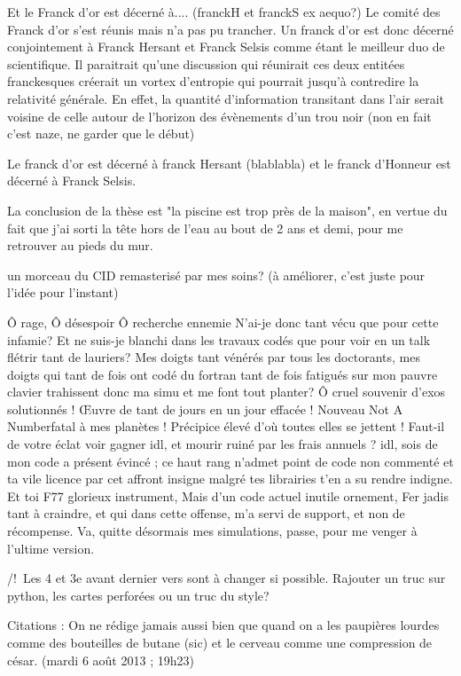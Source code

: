 Et le Franck d'or est décerné à.... (franckH et franckS ex aequo?)
Le comité des Franck d'or s'est réunis mais n'a pas pu trancher. Un franck d'or est donc décerné conjointement à Franck Hersant et Franck Selsis comme étant le meilleur duo de scientifique. Il paraitrait qu'une discussion qui réunirait ces deux entitées franckesques créerait un vortex d'entropie qui pourrait jusqu'à contredire la relativité générale. En effet, la quantité d'information transitant dans l'air serait voisine de celle autour de l'horizon des évènements d'un trou noir (non en fait c'est naze, ne garder que le début)

Le franck d'or est décerné à franck Hersant (blablabla) et le franck d'Honneur est décerné à Franck Selsis.

La conclusion de la thèse est "la piscine est trop près de la maison", en vertue du fait que j'ai sorti la tête hors de l'eau au bout de 2 ans et demi, pour me retrouver au pieds du mur.

un morceau du CID remasterisé par mes soins? (à améliorer, c'est juste pour l'idée pour l'instant)


Ô rage, Ô désespoir Ô recherche ennemie
N'ai-je donc tant vécu que pour cette infamie?
Et ne suis-je blanchi dans les travaux codés
que pour voir en un talk flétrir tant de lauriers? 
Mes doigts tant vénérés par tous les doctorants, 
mes doigts qui tant de fois ont codé du fortran
tant de fois fatigués sur mon pauvre clavier
trahissent donc ma simu et me font tout planter? 
Ô cruel souvenir d'exos solutionnés !
Œuvre de tant de jours en un jour effacée !
Nouveau \og Not A Number\fg fatal à mes planètes !
Précipice élevé d'où toutes elles se jettent !
Faut-il de votre éclat voir gagner idl, 
et mourir ruiné par les frais annuels ? 
idl, sois de mon code a présent évincé ; 
ce haut rang n'admet point de code non commenté
et ta vile licence par cet affront insigne
malgré tes librairies t'en a su rendre indigne. 
Et toi F77 glorieux instrument, 
Mais d'un code actuel inutile ornement, 
Fer jadis tant à craindre, et qui dans cette offense, 
m'a servi de support, et non de récompense. 
Va, quitte désormais mes simulations,
passe, pour me venger à l'ultime version.

/!\ Les 4 et 3e avant dernier vers sont à changer si possible. Rajouter un truc sur python, les cartes perforées ou un truc du style?


Citations : 
On ne rédige jamais aussi bien que quand on a les paupières lourdes comme des bouteilles de butane (sic) et le cerveau comme une compression de césar. (mardi 6 août 2013 ; 19h23)
